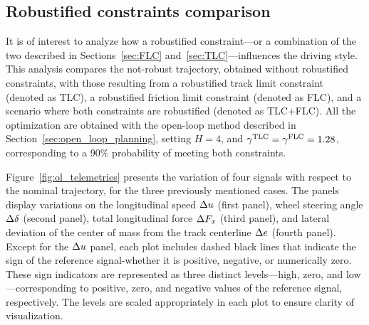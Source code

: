 \subsection{Robustified constraints comparison}
It is of interest to analyze how a robustified constraint---or a combination of the two described in Sections~\ref{sec:FLC} and~\ref{sec:TLC}---influences the driving style. This analysis compares the not-robust trajectory, obtained without robustified constraints, with those resulting from a robustified track limit constraint (denoted as TLC), a robustified friction limit constraint (denoted as FLC), and a scenario where both constraints are robustified (denoted as TLC+FLC). All the optimization are obtained with the open-loop method described in Section~\ref{sec:open_loop_planning}, setting $H=4$, and $\gamma^\textrm{TLC}=\gamma^\textrm{FLC}=1.28$, corresponding to a 90\% probability of meeting both constraints. 

Figure~\ref{fig:ol_telemetries} presents the variation of four signals with respect to the nominal trajectory, for the three previously mentioned cases. The panels display variations on the longitudinal speed $\Delta u$ (first panel), wheel steering angle $\Delta \delta$ (second panel), total longitudinal force $\Delta F_x$ (third panel), and lateral deviation of the center of mass from the track centerline $\Delta e$ (fourth panel). Except for the $\Delta u$ panel, each plot includes dashed black lines that indicate the sign of the reference signal-whether it is positive, negative, or numerically zero. These sign indicators are represented as three distinct levels---high, zero, and low---corresponding to positive, zero, and negative values of the reference signal, respectively. The levels are scaled appropriately in each plot to ensure clarity of visualization.

